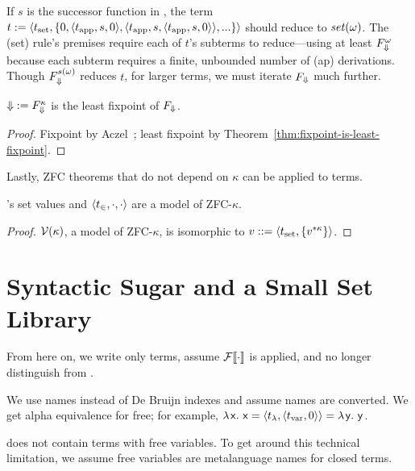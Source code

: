 \begin{example}
If $s$ is the successor function in \targetlang, the term
$t := \langle{t_\mathrm{set},\{{0,\langle{t_\mathrm{app},s,0}\rangle,\langle{t_\mathrm{app},s,\langle{t_\mathrm{app},s,0}\rangle}\rangle,...}\}}\rangle$
should reduce to $\mathit{set}(\omega)$. The (set) rule's premises require each of $t$'s subterms to reduce---using at least $F_{\operatorname{\Downarrow}}^\omega$ because each subterm requires a finite, unbounded number of (ap) derivations. Though $F_{\operatorname{\Downarrow}}^{s(\omega)}$ reduces $t$, for larger terms, we must iterate $F_{\operatorname{\Downarrow}}$ much further.
\exampleqed
\end{example}

\begin{theorem}
\label{thm:R-fixpoint}
$\operatorname{\Downarrow} := F_{\operatorname{\Downarrow}}^\kappa$ is the least fixpoint of $F_{\operatorname{\Downarrow}}$.
\end{theorem}
\begin{proof}
Fixpoint by Aczel~\cite[Theorem 1.3.4]{cit:aczel-1977-inductive}; least fixpoint by Theorem~\ref{thm:fixpoint-is-least-fixpoint}.
\end{proof}

Lastly, ZFC theorems that do not depend on $\kappa$ can be applied to \targetlang terms.

\begin{theorem}
\label{thm:lambda-zfc-is-a-model}
\targetlang's set values and $\langle{t_\in,\cdot,\cdot}\rangle$ are a model of ZFC-$\kappa$.
\end{theorem}
\begin{proof}
$\mathcal{V}(\kappa)$, a model of ZFC-$\kappa$, is isomorphic to $v ::= \langle{t_\mathrm{set},\ensuremath{\{{{v}^{*{\kappa}}}\}}}\rangle$.
\end{proof}


\section{Syntactic Sugar and a Small Set Library}

From here on, we write only \ftargetlang terms, assume $\mathcal{F}\!\left\llbracket{\cdot}\right\rrbracket$ is applied, and no longer distinguish \ftargetlang from \targetlang.

We use names instead of De Bruijn indexes and assume names are converted. We get alpha equivalence for free; for example, $\mathsf{\lambda\mspace{2mu}{x}\ldotp\, x} = \langle{t_\lambda,\langle{t_\mathrm{var},0}\rangle}\rangle = \mathsf{\lambda\mspace{2mu}{y}\ldotp\, y}$.


\targetlang does not contain terms with free variables. To get around this technical limitation, we assume free variables are metalanguage names for closed terms.

